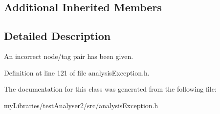 \subsection*{Additional Inherited Members}


\subsection{Detailed Description}
An incorrect node/tag pair has been given. 

Definition at line 121 of file analysis\+Exception.\+h.



The documentation for this class was generated from the following file\+:\begin{DoxyCompactItemize}
\item 
my\+Libraries/test\+Analyser2/src/analysis\+Exception.\+h\end{DoxyCompactItemize}
